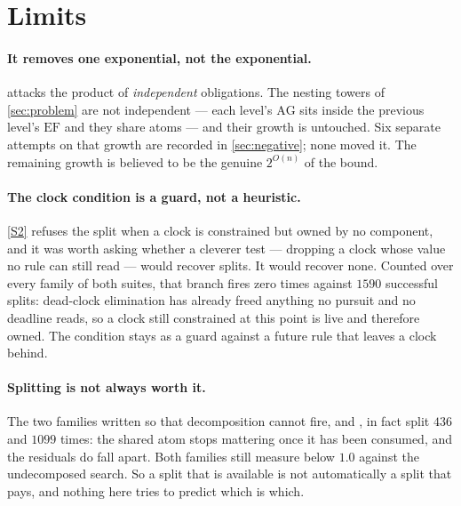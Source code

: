 \section{Limits}
\label{sec:limits}

\paragraph{It removes one exponential, not the exponential.}
 attacks the product of \emph{independent} obligations. The
nesting towers of \cref{sec:problem} are not independent --- each level's
$\mathrm{AG}$ sits inside the previous level's $\mathrm{EF}$ and they share
atoms --- and their growth is untouched. Six separate attempts on that growth
are recorded in \cref{sec:negative}; none moved it. The remaining growth is
believed to be the genuine $2^{O(n)}$ of the bound.

\paragraph{The clock condition is a guard, not a heuristic.}
\ref{S2} refuses the split when a clock is constrained but owned by no
component, and it was worth asking whether a cleverer test --- dropping a clock
whose value no rule can still read --- would recover splits. It would recover
none. Counted over every family of both suites, that branch fires zero times
against $1590$ successful splits: dead-clock elimination has already freed
anything no pursuit and no deadline reads, so a clock still constrained at this
point is live and therefore owned. The condition stays as a guard against a
future rule that leaves a clock behind.

\paragraph{Splitting is not always worth it.}
The two families written so that decomposition cannot fire,  and
, in fact split $436$ and $1099$ times: the shared atom stops
mattering once it has been consumed, and the residuals do fall apart. Both
families still measure below $1.0$ against the undecomposed search. So a split
that is available is not automatically a split that pays, and nothing here tries
to predict which is which.


